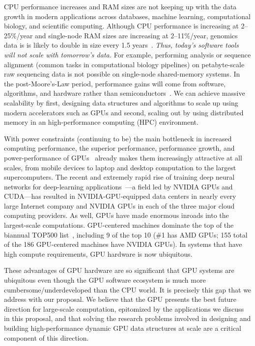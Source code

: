  CPU
performance increases and RAM sizes are not keeping up with the data growth in
modern applications across databases, machine learning, computational biology,
and scientific computing. Although CPU performance is increasing at
2--25\%/year and single-node RAM sizes are increasing at 2--11\%/year, genomics
data is is likely to double in size every 1.5 years~\cite{kodama2012sequence}.
\emph{Thus, today's software tools will not scale with tomorrow's data.} For
example, performing \kmer analysis or sequence alignment (common tasks in
computational biology pipelines) on petabyte-scale raw sequencing data is not
possible on single-node shared-memory systems. In the post-Moore’s-Law period,
performance gains will come from software, algorithms, and hardware rather than
semiconductors~\cite{leiserson2020there}. We can achieve massive scalability by
first, designing data structures and algorithms to scale up using modern
accelerators such as GPUs and second, scaling out by using distributed memory
in an high-performance computing (HPC) environment.

With power constraints (continuing to be) the main bottleneck in increased
computing performance, the superior performance, performance growth, and
power-performance of GPUs~\cite{Dally:2010:GCT,Dally:2021:EOT} already makes
them increasingly attractive at all scales, from mobile devices to laptop and
desktop computation to the largest supercomputers. The recent and extremely
rapid rise of training deep neural networks for deep-learning
applications~\cite{Amodei:2015:DS2,Chetlur:2014:CEP,Coates:2013:DLW,Hannun:2014:DSU}---a
field led by NVIDIA GPUs and CUDA---has resulted in NVIDIA-GPU-equipped data
centers in nearly every large Internet company and NVIDIA GPUs in each of the
three major cloud computing providers. As well, GPUs have made enormous inroads
into the largest-scale computations. GPU-centered machines dominate the top of
the biannual TOP500 list~\cite{top500:jun2024}, including 9 of the top 10 (\#1
has AMD GPUs; 155 total of the 186 GPU-centered machines have NVIDIA GPUs). In
systems that have high compute requirements, GPU hardware is now ubiquitous. 
%
%

These advantages of GPU hardware are so significant that GPU systems are
ubiquitous even though the GPU software ecosystem is much more
cumbersome/underdeveloped than the CPU world. It is precisely this gap that we
address with our proposal. We believe that the GPU presents the best future
direction for large-scale computation, epitomized by the applications we
discuss in this proposal, and that solving the research problems involved in
designing and building high-performance dynamic GPU data structures at scale
are a critical component of this direction.

